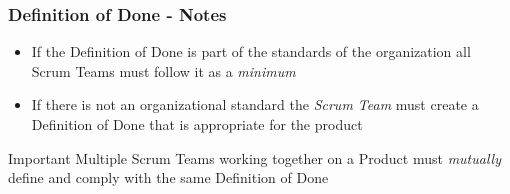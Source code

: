 \begin{frame}
	\frametitle{Definition of Done - Notes}
	\begin{itemize}
		\setlength\itemsep{0.7em}
		\item If the Definition of Done is part of the standards of the organization all Scrum Teams must follow it as a \textit{minimum}
		\item If there is not an organizational standard the \textit{Scrum Team} must create a Definition of Done that is appropriate for the product
	\end{itemize}
	 {
		\vspace{1em}
		\begin{alertblock}{Important}
			Multiple Scrum Teams working together on a Product must \textit{mutually} define and comply with the same Definition of Done
		\end{alertblock}
	}
\end{frame}
